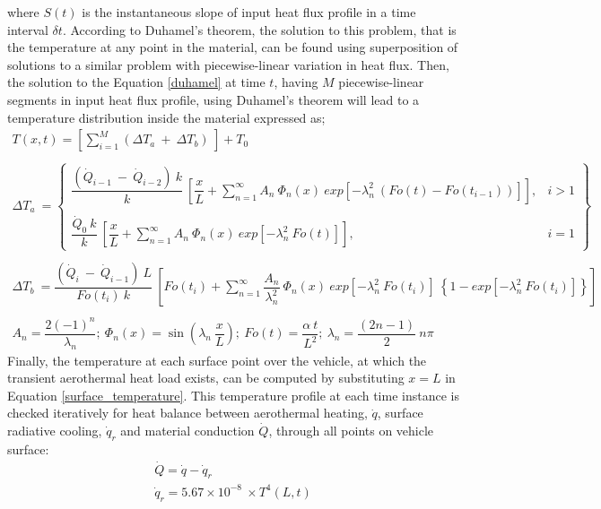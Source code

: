 \documentclass[%
 aip,
 amsmath,amssymb,
preprint,%
]{revtex4-1}
\begin{document}
where $S(t)$ is the instantaneous slope of input heat flux profile in a time interval $\delta t$. According to Duhamel's theorem, the solution to this problem, that is the temperature at any point in the material, can be found using superposition of solutions to a similar problem with piecewise-linear variation in heat flux. Then, the solution to the Equation \eqref{duhamel} at time $t$, having $M$ piecewise-linear segments in input heat flux profile, using Duhamel's theorem will lead to a temperature distribution inside the material expressed as;
\begin{equation}
    \begin{array}{lr}
        T(x,t) = \left[\sum\limits_{i=1}^{M} \left(\Delta T_a~ + ~\Delta T_b\right)~\right] + T_0\\
        \\
        \Delta T_a~ = 
        \left\{
            \begin{array}{lr}
                \dfrac{\left(\dot{Q}_{i-1}~ - ~\dot{Q}_{i-2}\right)~k}{k}~\left[\dfrac{x}{L}+\sum\limits_{n=1}^{\infty} A_n~\Phi_n(x)~exp\left[-\lambda_{n}^{2}~(Fo(t) - Fo(t_{i-1}))\right]\right], & i > 1  \\
                \\
                \dfrac{\dot{Q}_{0}~k}{k}~\left[\dfrac{x}{L}+\sum\limits_{n=1}^{\infty} A_n~\Phi_n(x)~exp\left[-\lambda_{n}^{2}~Fo(t)\right]\right], & i = 1
            \end{array}
        \right\}\\
        \\
        \Delta T_b~ = \dfrac{\left(\dot{Q}_{i}~ - ~\dot{Q}_{i-1}\right)~L}{Fo(t_i)~k}~\left[Fo(t_i)+\sum\limits_{n=1}^{\infty} \dfrac{A_n}{\lambda_{n}^{2}}~\Phi_n(x)~exp\left[-\lambda_{n}^{2}~Fo(t_i)\right]~\left\{1-exp\left[-\lambda_{n}^{2}~Fo(t_i)\right]\right\}\right]\\
        \\
        A_n = \dfrac{2(-1)^{n}}{\lambda_n};~ \Phi_n(x) = \sin\left(\lambda_n~\dfrac{x}{L}\right);~ Fo(t) = \dfrac {\alpha~t}{L^{2}};~ \lambda_n = \dfrac{(2n-1)}{2}~n\pi
    \end{array}
    \label{surface_temperature}
\end{equation}
Finally, the temperature at each surface point over the vehicle, at which the transient aerothermal heat load exists, can be computed by substituting $x=L$ in Equation \eqref{surface_temperature}. This temperature profile at each time instance is checked iteratively for heat balance between aerothermal heating, $\dot{q}$, surface radiative cooling, $\dot{q}_{r}$ and material conduction $\dot{Q}$, through all points on vehicle surface:
\begin{equation}
    \begin{array}{lr}
        \dot{Q} = \dot{q} - \dot{q}_{r}\\
        \dot{q}_{r} = 5.67\times 10^{-8}~\times T^4(L,t)
    \end{array}
    \label{heat_balance}
\end{equation}
\end{document}
